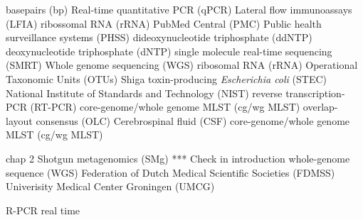 
\begin{acronym}[MPC] %

\end{acronym}

basepairs (bp)
Real-time quantitative PCR (qPCR)
Lateral flow immunoassays (LFIA)
ribossomal RNA (rRNA)
PubMed Central\textsuperscript{\small\textregistered} (PMC)
Public health surveillance systems (PHSS)
dideoxynucleotide triphosphate (ddNTP) 
deoxynucleotide triphosphate (dNTP)
single molecule real-time sequencing (SMRT)
Whole genome sequencing (WGS)
ribosomal RNA (rRNA)
Operational Taxonomic Units (OTUs)
Shiga toxin-producing \textit{Escherichia coli} (STEC)
National Institute of Standards and Technology (NIST)
reverse transcription-PCR (RT-PCR)
core-genome/whole genome MLST (cg/wg MLST)
overlap-layout consensus (OLC)
Cerebrospinal fluid (CSF)
core-genome/whole genome MLST (cg/wg MLST)

chap 2 
Shotgun metagenomics (SMg) *** Check in introduction
whole-genome sequence (WGS)
Federation of Dutch Medical Scientific Societies (FDMSS)
Univerisity Medical Center Groningen (UMCG)

R-PCR real time 